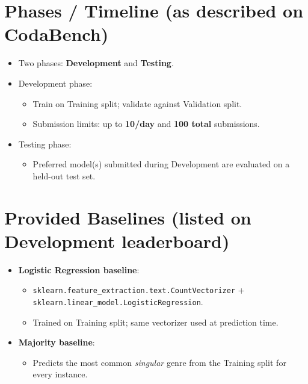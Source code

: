 \documentclass[11pt]{article}
\begin{document}
\section{Phases / Timeline (as described on CodaBench)}
\begin{itemize}[leftmargin=*]
  \item Two phases: \textbf{Development} and \textbf{Testing}.
  \item Development phase:
  \begin{itemize}
    \item Train on Training split; validate against Validation split.
    \item Submission limits: up to \textbf{10/day} and \textbf{100 total} submissions.
  \end{itemize}
  \item Testing phase:
  \begin{itemize}
    \item Preferred model(s) submitted during Development are evaluated on a held-out test set.
  \end{itemize}
\end{itemize}

\section{Provided Baselines (listed on Development leaderboard)}
\begin{itemize}[leftmargin=*]
  \item \textbf{Logistic Regression baseline}:
  \begin{itemize}
    \item \texttt{sklearn.feature\_extraction.text.CountVectorizer} + \texttt{sklearn.linear\_model.LogisticRegression}.
    \item Trained on Training split; same vectorizer used at prediction time.
  \end{itemize}
  \item \textbf{Majority baseline}:
  \begin{itemize}
    \item Predicts the most common \emph{singular} genre from the Training split for every instance.
  \end{itemize}
\end{itemize}
\end{document}
